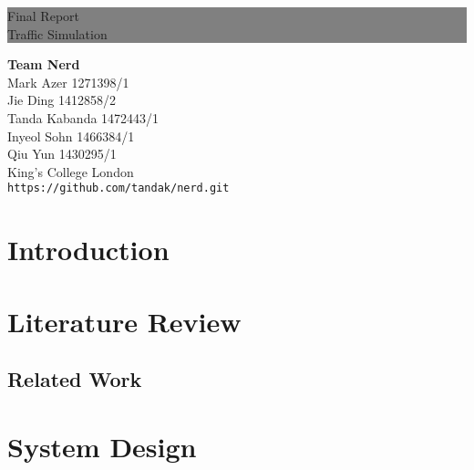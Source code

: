 \documentclass[11pt]{article}
\begin{document}
	
	\thispagestyle{empty} %

	\colorbox{grey}{
		\parbox[t]{1.0\linewidth}{
			\centering \fontsize{180pt}{40pt}\selectfont %
			\vspace*{0.3cm} %
			
			\hfill Final Report \\
			\hfill Traffic Simulation\par
			
			\vspace*{0.7cm} %
		}
	}
	\vfill %
	{\centering \large 
		\hfill \textbf{Team Nerd} \\
		\hfill Mark Azer 1271398/1\\
		\hfill Jie Ding 1412858/2 \\
		\hfill Tanda Kabanda 1472443/1 \\
		\hfill Inyeol Sohn 1466384/1 \\
		\hfill Qiu Yun 1430295/1 \\
		\hfill King's College London \\
		\hfill \texttt{https://github.com/tandak/nerd.git} \\
	}
	\clearpage %
	\tableofcontents
	
	\section{Introduction}
	\section{Literature Review}
	\subsection{Related Work}
	\section{System Design}
\end{document}
